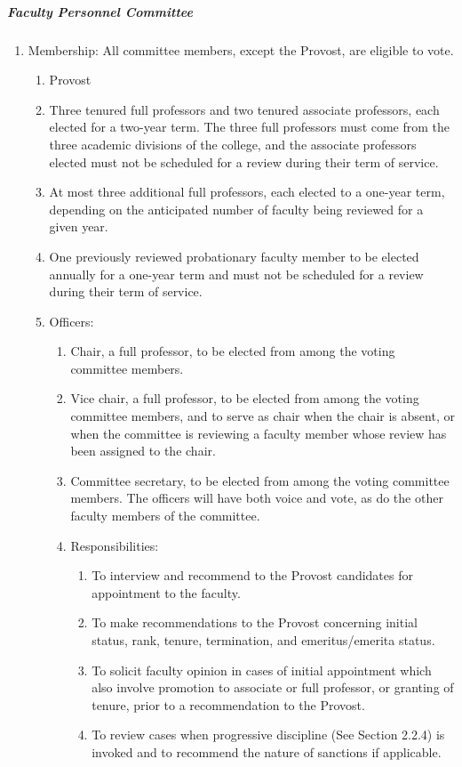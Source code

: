 \documentclass[letterpaper, 11pt]{article}
\begin{document}
				\subparagraph{Faculty Personnel Committee}
					\begin{enumerate}[label=\alph*)]
						\item{Membership:
							All committee members, except the Provost, are eligible to vote.
							\begin{enumerate}[label=\arabic*)]
								\item{Provost}
								\item{Three tenured full professors and two tenured associate professors, each elected for a two-year term.  The three full professors must come from the three academic divisions of the college, and the associate professors elected must not be scheduled for a review during their term of service.}
								\item{At most three additional full professors, each elected to a one-year term, depending on the anticipated number of faculty being reviewed for a given year.}
								\item{One previously reviewed probationary faculty member to be elected annually for a one-year term and must not be scheduled for a review during their term of service.}
								\item{Officers:
									\begin{enumerate}[label=\arabic*)]
										\item{Chair, a full professor, to be elected from among the voting committee members.}
										\item{Vice chair, a full professor, to be elected from among the voting committee members, and to serve as chair when the chair is absent, or when the committee is reviewing a faculty member whose review has been assigned to the chair.}
										\item{Committee secretary, to be elected from among the voting committee members.  The officers will have both voice and vote, as do the other faculty members of the committee.}
										\item{Responsibilities:
											\begin{enumerate}[label=\arabic*)]
												\item{To interview and recommend to the Provost candidates for appointment to the faculty.}
												\item{To make recommendations to the Provost concerning initial status, rank, tenure, termination, and emeritus/emerita status.}
												\item{To solicit faculty opinion in cases of initial appointment which also involve promotion to associate or full professor, or granting of tenure, prior to a recommendation to the Provost.}
												\item{To review cases when progressive discipline (See Section 2.2.4) is invoked and to recommend the nature of sanctions if applicable.}
											\end{enumerate}
										}
									\end{enumerate}
								}
							\end{enumerate}
						}
					\end{enumerate}
\end{document}
